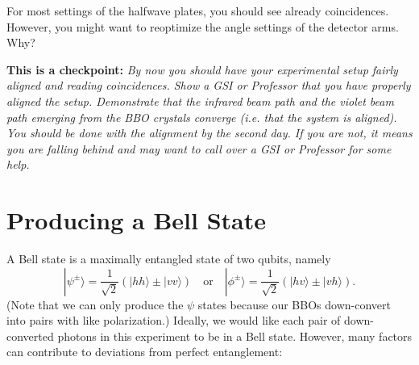 \documentclass{../lab}
\begin{document}
For most settings of the halfwave plates, you should see already coincidences. However, you might want to reoptimize the angle settings of the detector arms. Why?

\textbf{This is a checkpoint:} \emph{By now you should have your experimental setup fairly aligned and reading coincidences. Show a GSI or Professor that you have properly aligned the setup. Demonstrate that the infrared beam path and the violet beam path emerging from the BBO crystals converge (i.e. that the system is aligned). You should be done with the alignment by the second day. If you are not, it means you are falling behind and may want to call over a GSI or Professor for some help.}

\section{Producing a Bell State}

A Bell state is a maximally entangled state of two qubits, namely
\begin{equation}
    |\psi^\pm\rangle = \frac{1}{\sqrt{2}}(|hh\rangle \pm |vv\rangle)
    \quad \text{or} \quad
    |\phi^\pm\rangle = \frac{1}{\sqrt{2}}(|hv\rangle \pm |vh\rangle).
\end{equation}
(Note that we can only produce the $\psi$ states because our BBOs down-convert into pairs with like polarization.) Ideally, we would like each pair of down-converted photons in this experiment to be in a Bell state. However, many factors can contribute to deviations from perfect entanglement:
\end{document}
